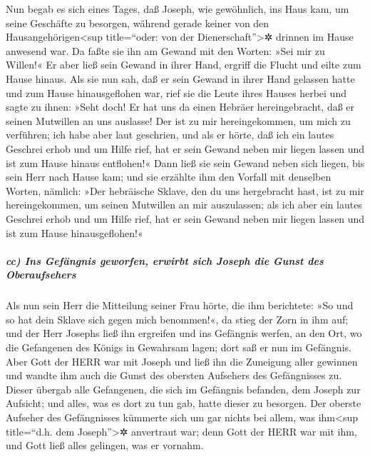  Nun begab es sich eines Tages, daß Joseph, wie
gewöhnlich, ins Haus kam, um seine Geschäfte zu besorgen, während gerade
keiner von den Hausangehörigen\textless sup title=``oder: von der
Dienerschaft''\textgreater✲ drinnen im Hause anwesend war.
 Da faßte sie ihn am Gewand mit den Worten: »Sei mir zu
Willen!« Er aber ließ sein Gewand in ihrer Hand, ergriff die Flucht und
eilte zum Hause hinaus.  Als sie nun sah, daß er sein
Gewand in ihrer Hand gelassen hatte und zum Hause hinausgeflohen war,
 rief sie die Leute ihres Hauses herbei und sagte zu
ihnen: »Seht doch! Er hat uns da einen Hebräer hereingebracht, daß er
seinen Mutwillen an uns auslasse! Der ist zu mir hereingekommen, um mich
zu verführen; ich habe aber laut geschrien,  und als er
hörte, daß ich ein lautes Geschrei erhob und um Hilfe rief, hat er sein
Gewand neben mir liegen lassen und ist zum Hause hinaus entflohen!«
 Dann ließ sie sein Gewand neben sich liegen, bis sein
Herr nach Hause kam;  und sie erzählte ihm den Vorfall
mit denselben Worten, nämlich: »Der hebräische Sklave, den du uns
hergebracht hast, ist zu mir hereingekommen, um seinen Mutwillen an mir
auszulassen;  als ich aber ein lautes Geschrei erhob und
um Hilfe rief, hat er sein Gewand neben mir liegen lassen und ist zum
Hause hinausgeflohen!«

\hypertarget{cc-ins-gefuxe4ngnis-geworfen-erwirbt-sich-joseph-die-gunst-des-oberaufsehers}{%
\subparagraph{cc) Ins Gefängnis geworfen, erwirbt sich Joseph die Gunst
des
Oberaufsehers}\label{cc-ins-gefuxe4ngnis-geworfen-erwirbt-sich-joseph-die-gunst-des-oberaufsehers}}

 Als nun sein Herr die Mitteilung seiner Frau hörte, die
ihm berichtete: »So und so hat dein Sklave sich gegen mich benommen!«,
da stieg der Zorn in ihm auf;  und der Herr Josephs ließ
ihn ergreifen und ins Gefängnis werfen, an den Ort, wo die Gefangenen
des Königs in Gewahrsam lagen; dort saß er nun im Gefängnis.
 Aber Gott der HERR war mit Joseph und ließ ihn die
Zuneigung aller gewinnen und wandte ihm auch die Gunst des obersten
Aufsehers des Gefängnisses zu.  Dieser übergab alle
Gefangenen, die sich im Gefängnis befanden, dem Joseph zur Aufsicht; und
alles, was es dort zu tun gab, hatte dieser zu besorgen. 
Der oberste Aufseher des Gefängnisses kümmerte sich um gar nichts bei
allem, was ihm\textless sup title=``d.h. dem Joseph''\textgreater✲
anvertraut war; denn Gott der HERR war mit ihm, und Gott ließ alles
gelingen, was er vornahm.

